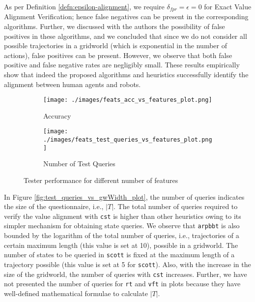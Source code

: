 As per Definition \ref{defn:epsilon-alignment}, we require $\delta_{fpr} = \epsilon = 0$ for Exact Value Alignment Verification; hence false negatives can be present in the corresponding algorithms. Further, we discussed with the authors the possibility of false positives in these algorithms, and we concluded that since we do not consider all possible trajectories in a gridworld (which is exponential in the number of actions), false positives can be present. However, we observe that both false positive and false negative rates are negligibly small. These results empirically show that indeed the proposed algorithms and heuristics successfully identify the alignment between human agents and robots. 

\begin{figure}[!hbtp]
    \centering
    \begin{subfigure}[!ht]{0.35\textwidth}
         \centering
         \texttt{[image: ./images/feats\_acc\_vs\_features\_plot.png]}
         \caption{Accuracy}
         \label{fig:feats_acc_vs_features_plot}
    \end{subfigure}
    \hspace{5mm}
    \begin{subfigure}[!ht]{0.35\textwidth}
         \centering
         \texttt{[image: ./images/feats\_test\_queries\_vs\_features\_plot.png]}
         \caption{Number of Test Queries}
         \label{fig:feats_test_queries_vs_features_plot}
     \end{subfigure}
    \caption{Tester performance for different number of features}
    \label{fig:tester_perf_diff_feats}
\end{figure}

In Figure \ref{fig:test_queries_vs_gwWidth_plot}, the number of queries indicates the size of the questionnaire, i.e., $|T|$. The total number of queries required to verify the value alignment with \texttt{cst} is higher than other heuristics owing to its simpler mechanism for obtaining state queries. We observe that \texttt{arpbbt} is also bounded by the logarithm of the total number of queries, i.e., trajectories of a certain maximum length (this value is set at 10), possible in a gridworld. The number of states to be queried in \texttt{scott} is fixed at the maximum length of a trajectory possible (this value is set at 5 for \texttt{scott}). Also, with the increase in the size of the gridworld, the number of queries with \texttt{cst} increases. Further, we have not presented the number of queries for \texttt{rt} and \texttt{vft} in plots because they have well-defined mathematical formulae to calculate $|T|$. 

